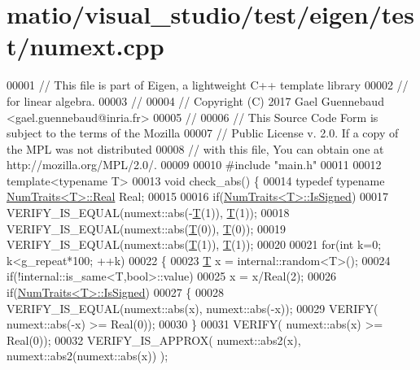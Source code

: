 \hypertarget{matio_2visual__studio_2test_2eigen_2test_2numext_8cpp_source}{}\section{matio/visual\+\_\+studio/test/eigen/test/numext.cpp}
\label{matio_2visual__studio_2test_2eigen_2test_2numext_8cpp_source}

\begin{DoxyCode}
00001 \textcolor{comment}{// This file is part of Eigen, a lightweight C++ template library}
00002 \textcolor{comment}{// for linear algebra.}
00003 \textcolor{comment}{//}
00004 \textcolor{comment}{// Copyright (C) 2017 Gael Guennebaud <gael.guennebaud@inria.fr>}
00005 \textcolor{comment}{//}
00006 \textcolor{comment}{// This Source Code Form is subject to the terms of the Mozilla}
00007 \textcolor{comment}{// Public License v. 2.0. If a copy of the MPL was not distributed}
00008 \textcolor{comment}{// with this file, You can obtain one at http://mozilla.org/MPL/2.0/.}
00009 
00010 \textcolor{preprocessor}{#include "main.h"}
00011 
00012 \textcolor{keyword}{template}<\textcolor{keyword}{typename} T>
00013 \textcolor{keywordtype}{void} check\_abs() \{
00014   \textcolor{keyword}{typedef} \textcolor{keyword}{typename} \hyperlink{group___core___module_struct_eigen_1_1_num_traits}{NumTraits<T>::Real} Real;
00015 
00016   \textcolor{keywordflow}{if}(\hyperlink{group___core___module_struct_eigen_1_1_num_traits}{NumTraits<T>::IsSigned})
00017     VERIFY\_IS\_EQUAL(numext::abs(-\hyperlink{group___sparse_core___module}{T}(1)), \hyperlink{group___sparse_core___module}{T}(1));
00018   VERIFY\_IS\_EQUAL(numext::abs(\hyperlink{group___sparse_core___module}{T}(0)), \hyperlink{group___sparse_core___module}{T}(0));
00019   VERIFY\_IS\_EQUAL(numext::abs(\hyperlink{group___sparse_core___module}{T}(1)), \hyperlink{group___sparse_core___module}{T}(1));
00020 
00021   \textcolor{keywordflow}{for}(\textcolor{keywordtype}{int} k=0; k<g\_repeat*100; ++k)
00022   \{
00023     \hyperlink{group___sparse_core___module}{T} x = internal::random<T>();
00024     \textcolor{keywordflow}{if}(!internal::is\_same<T,bool>::value)
00025       x = x/Real(2);
00026     \textcolor{keywordflow}{if}(\hyperlink{group___core___module_struct_eigen_1_1_num_traits}{NumTraits<T>::IsSigned})
00027     \{
00028       VERIFY\_IS\_EQUAL(numext::abs(x), numext::abs(-x));
00029       VERIFY( numext::abs(-x) >= Real(0));
00030     \}
00031     VERIFY( numext::abs(x) >= Real(0));
00032     VERIFY\_IS\_APPROX( numext::abs2(x), numext::abs2(numext::abs(x)) );

\end{DoxyCode}
